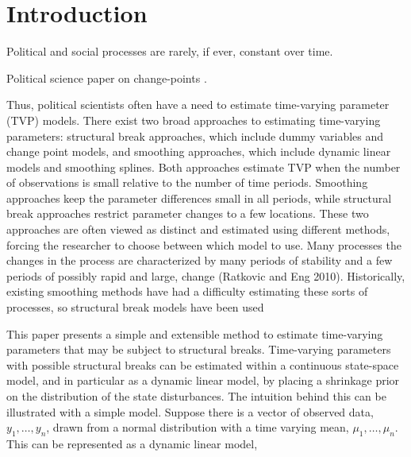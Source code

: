 
\newcommand{\ModelII}[1]{\texttt{#1}}


\section{Introduction}
\label{dlm:sec:introduction}

Political and social processes are rarely, if ever, constant over time.

Political science paper on change-points \parencites{CalderiaZorn1998}{WesternKleykamp2004}{Spirling2007a}{Spirling2007b}{Park2010}{Park2011}{Blackwell2012}.

Thus, political scientists often have a need to estimate time-varying parameter (TVP) models.
There exist two broad approaches to estimating time-varying parameters: structural break approaches, which include dummy variables and change point models, and smoothing approaches, which include dynamic linear models and smoothing splines. 
Both approaches estimate TVP when the number of observations is small relative to the number of time periods. 
Smoothing approaches keep the parameter differences small in all periods, while structural break approaches restrict parameter changes to a few locations. 
These two approaches are often viewed as distinct and estimated using different methods, forcing the researcher to choose between which model to use.
Many processes the changes in the process are characterized by many periods of stability and a few periods of possibly rapid and large, change (Ratkovic and Eng 2010).
Historically, existing smoothing methods have had a difficulty estimating these sorts of processes, so structural break models have been used

This paper presents a simple and extensible method to estimate time-varying parameters that may be subject to structural breaks. 
Time-varying parameters with possible structural breaks can be estimated within a continuous state-space model, and in particular as a dynamic linear model, by placing a shrinkage prior on the distribution of the state disturbances.
The intuition behind this can be illustrated with a simple model.
Suppose there is a vector of observed data, $y_{1}, \dots, y_{n}$, drawn from a normal distribution with a time varying mean, $\mu_{1}, \dots, \mu_{n}$.
This can be represented as a dynamic linear model,

